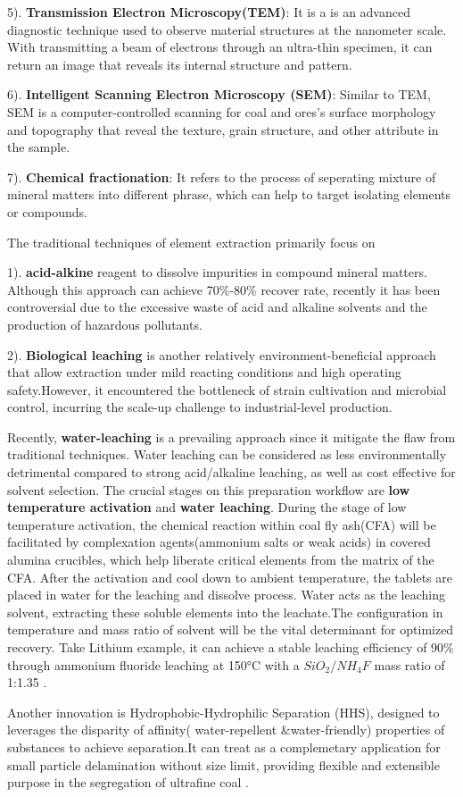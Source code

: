 \documentclass[preprint, 3p,
authoryear]{elsarticle} %
\begin{document}
5). \textbf{Transmission Electron Microscopy(TEM)}: It is a is an
advanced diagnostic technique used to observe material structures at the
nanometer scale. With transmitting a beam of electrons through an
ultra-thin specimen, it can return an image that reveals its internal
structure and pattern.

6). \textbf{Intelligent Scanning Electron Microscopy (SEM)}: Similar to
TEM, SEM is a computer-controlled scanning for coal and ores's surface
morphology and topography that reveal the texture, grain structure, and
other attribute in the sample.

7). \textbf{Chemical fractionation}: It refers to the process of
seperating mixture of mineral matters into different phrase, which can
help to target isolating elements or compounds.

The traditional techniques of element extraction primarily focus on

1). \textbf{acid-alkine} reagent to dissolve impurities in compound
mineral matters. Although this approach can achieve 70\%-80\% recover
rate, recently it has been controversial due to the excessive waste of
acid and alkaline solvents and the production of hazardous pollutants.

2). \textbf{Biological leaching} is another relatively
environment-beneficial approach that allow extraction under mild
reacting conditions and high operating safety.However, it encountered
the bottleneck of strain cultivation and microbial control, incurring
the scale-up challenge to industrial-level production.

Recently, \textbf{water-leaching} is a prevailing approach since it
mitigate the flaw from traditional techniques. Water leaching can be
considered as less environmentally detrimental compared to strong
acid/alkaline leaching, as well as cost effective for solvent selection.
The crucial stages on this preparation workflow are \textbf{low
temperature activation} and \textbf{water leaching}. During the stage of
low temperature activation, the chemical reaction within coal fly
ash(CFA) will be facilitated by complexation agents(ammonium salts or
weak acids) in covered alumina crucibles, which help liberate critical
elements from the matrix of the CFA. After the activation and cool down
to ambient temperature, the tablets are placed in water for the leaching
and dissolve process. Water acts as the leaching solvent, extracting
these soluble elements into the leachate.The configuration in
temperature and mass ratio of solvent will be the vital determinant for
optimized recovery. Take Lithium example, it can achieve a stable
leaching efficiency of 90\% through ammonium fluoride leaching at 150°C
with a \(SiO_2/NH_4F\) mass ratio of 1:1.35 \citet{Xu2021}.

Another innovation is Hydrophobic-Hydrophilic Separation (HHS), designed
to leverages the disparity of affinity( water-repellent
\&water-friendly) properties of substances to achieve separation.It can
treat as a complemetary application for small particle delamination
without size limit, providing flexible and extensible purpose in the
segregation of ultrafine coal \citet{Hodgkinson2021}.

\renewcommand\refname{References}

\end{document}
